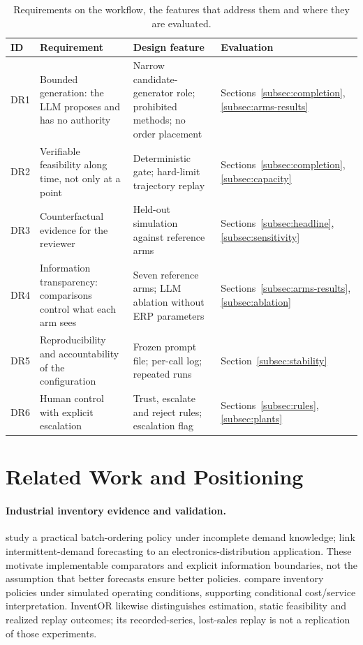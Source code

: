 \documentclass[preprint,12pt,nonatbib]{elsarticle}
\begin{document}
\begin{table}[htbp]
\centering
\caption{Requirements on the workflow, the features that address them and where they are evaluated.}
\label{tab:requirements}
\scriptsize
\setlength{\tabcolsep}{3pt}
\renewcommand{\arraystretch}{1.1}
\begin{tabularx}{\textwidth}{p{0.8cm} p{3.6cm} L p{2.7cm}}
\hline
\textbf{ID} & \textbf{Requirement} & \textbf{Design feature} & \textbf{Evaluation} \\
\hline
DR1 & Bounded generation: the LLM proposes and has no authority & Narrow candidate-generator role; prohibited methods; no order placement & Sections~\ref{subsec:completion}, \ref{subsec:arms-results} \\
DR2 & Verifiable feasibility along time, not only at a point & Deterministic gate; hard-limit trajectory replay & Sections~\ref{subsec:completion}, \ref{subsec:capacity} \\
DR3 & Counterfactual evidence for the reviewer & Held-out simulation against reference arms & Sections~\ref{subsec:headline}, \ref{subsec:sensitivity} \\
DR4 & Information transparency: comparisons control what each arm sees & Seven reference arms; LLM ablation without ERP parameters & Sections~\ref{subsec:arms-results}, \ref{subsec:ablation} \\
DR5 & Reproducibility and accountability of the configuration & Frozen prompt file; per-call log; repeated runs & Section~\ref{subsec:stability} \\
DR6 & Human control with explicit escalation & Trust, escalate and reject rules; escalation flag & Sections~\ref{subsec:rules}, \ref{subsec:plants} \\
\hline
\end{tabularx}
\end{table}

\section{Related Work and Positioning}
\label{sec:literature}

\paragraph{Industrial inventory evidence and validation.}
\textcite{bai2012batch} study a practical batch-ordering policy under incomplete demand knowledge; \textcite{fu2019unison} link intermittent-demand forecasting to an electronics-distribution application. These motivate implementable comparators and explicit information boundaries, not the assumption that better forecasts ensure better policies. \textcite{lau2008effects} compare inventory policies under simulated operating conditions, supporting conditional cost/service interpretation. InventOR likewise distinguishes estimation, static feasibility and realized replay outcomes; its recorded-series, lost-sales replay is not a replication of those experiments.
\end{document}
